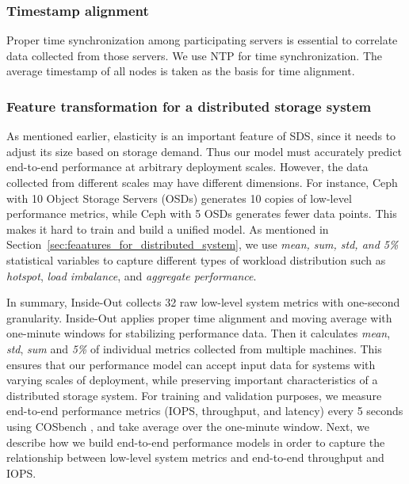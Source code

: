 \subsubsection{Timestamp alignment}
Proper time synchronization among participating servers is essential to correlate data collected from those servers. 
We use NTP for time synchronization.
The average timestamp of all nodes is taken as the basis for time alignment.

\subsubsection{Feature transformation for a distributed storage system}
%
As mentioned earlier, elasticity is an important feature of SDS, since it needs to adjust its size based on storage demand. 
Thus our model must accurately predict end-to-end performance at arbitrary deployment scales.
However, the data collected from different scales may have different dimensions. 
For instance, Ceph with 10 Object Storage Servers (OSDs) generates 10 copies of low-level performance metrics, 
while Ceph with 5 OSDs generates fewer data points. This makes it hard to train and build a unified model.
As mentioned in Section~\ref{sec:feaatures_for_distributed_system}, we use \emph{mean, sum, std, and 5\%} statistical 
variables to capture 
different types of workload distribution such as
\emph{hotspot}, \emph{load imbalance}, and \emph{aggregate performance}.


In summary, Inside-Out collects 32 raw low-level system metrics with one-second granularity.
Inside-Out applies proper time alignment and moving average with one-minute windows for stabilizing performance data.
Then it calculates \emph{mean}, \emph{std}, \emph{sum} and \emph{5\%} of individual metrics collected from multiple machines.
This ensures that our performance model can accept input data for systems with varying scales of deployment, 
while preserving important characteristics of a distributed storage system.
For training and validation purposes, 
we measure end-to-end performance metrics (IOPS, throughput, and latency) every 5 seconds using COSbench \cite{cosbench}, and take average over the one-minute window.
Next, we describe how we build end-to-end performance models in order to capture the relationship between low-level system metrics and end-to-end throughput and IOPS.

